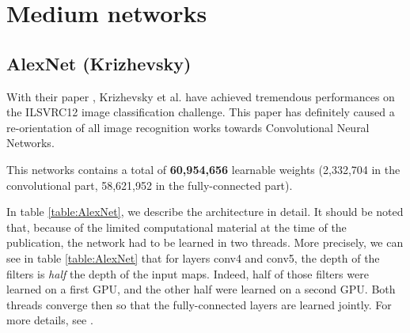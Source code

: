 

\section{Medium networks}



\subsection{AlexNet (Krizhevsky)}
\label{AlexNet}

With their paper \cite{Krizhevsky12}, Krizhevsky et al. have achieved tremendous performances on the ILSVRC12 image classification challenge. This 
paper has definitely caused a re-orientation of all image recognition works towards Convolutional Neural Networks. 

This networks contains a total of \textbf{60,954,656} learnable weights (2,332,704 in the convolutional part, 58,621,952 in the fully-connected part).

In table \ref{table:AlexNet}, we describe the architecture in detail. 
It should be noted that, because of the limited computational material at the time of the publication, the network had to be learned in two threads. 
More precisely, we can see in table \ref{table:AlexNet} that for layers conv4 and conv5, the depth of the filters is \textit{half} the depth of the 
input maps. Indeed, half of those filters were learned on a first GPU, and the other half were learned on a second GPU. Both threads converge then so 
that the fully-connected layers are learned jointly. For more details, see \cite{Krizhevsky12}. 




